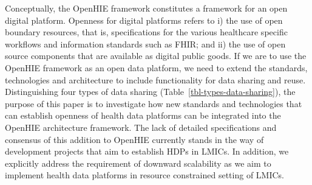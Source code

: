 \documentclass[
  authoryear]{elsarticle}
\begin{document}
Conceptually, the OpenHIE framework constitutes a framework for an open
digital platform. Openness for digital platforms refers to i) the use of
open boundary resources, that is, specifications for the various
healthcare specific workflows and information standards such as FHIR;
and ii) the use of open source components that are available as digital
public goods\citep{digitalpublicgoods}. If we are to use the OpenHIE
framework as an open data platform, we need to extend the standards,
technologies and architecture to include functionality for data sharing
and reuse. Distinguishing four types of data sharing
(Table~\ref{tbl-types-data-sharing}), the purpose of this paper is to
investigate how new standards and technologies that can establish
openness of health data platforms can be integrated into the OpenHIE
architecture framework. The lack of detailed specifications and
consensus of this addition to OpenHIE currently stands in the way of
development projects that aim to establish HDPs in LMICs. In addition,
we explicitly address the requirement of downward scalability as we aim
to implement health data platforms in resource constrained setting of
LMICs.
\end{document}
